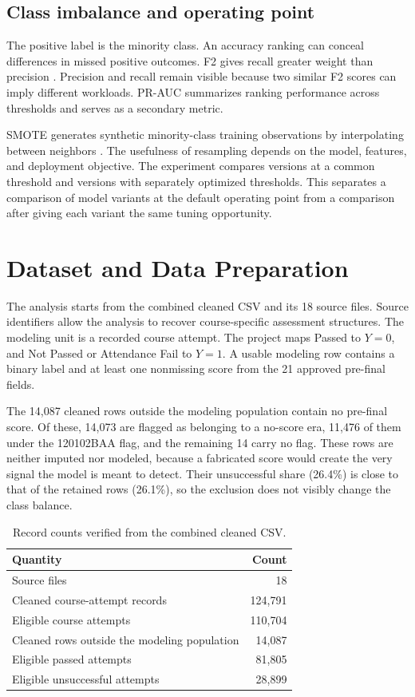 \documentclass[runningheads]{llncs}
\begin{document}
\subsection{Class imbalance and operating point}
The positive label is the minority class. An accuracy ranking can conceal differences in missed positive outcomes. F2 gives recall greater weight than precision \cite{fbeta}. Precision and recall remain visible because two similar F2 scores can imply different workloads. PR-AUC summarizes ranking performance across thresholds and serves as a secondary metric.

SMOTE generates synthetic minority-class training observations by interpolating between neighbors \cite{smote}. The usefulness of resampling depends on the model, features, and deployment objective. The experiment compares versions at a common threshold and versions with separately optimized thresholds. This separates a comparison of model variants at the default operating point from a comparison after giving each variant the same tuning opportunity.

\section{Dataset and Data Preparation}
The analysis starts from the combined cleaned CSV and its 18 source files. Source identifiers allow the analysis to recover course-specific assessment structures. The modeling unit is a recorded course attempt. The project maps Passed to \(Y=0\), and Not Passed or Attendance Fail to \(Y=1\). A usable modeling row contains a binary label and at least one nonmissing score from the 21 approved pre-final fields.

The 14,087 cleaned rows outside the modeling population contain no pre-final score. Of these, 14,073 are flagged as belonging to a no-score era, 11,476 of them under the 120102BAA flag, and the remaining 14 carry no flag. These rows are neither imputed nor modeled, because a fabricated score would create the very signal the model is meant to detect. Their unsuccessful share (26.4\%) is close to that of the retained rows (26.1\%), so the exclusion does not visibly change the class balance.

\begin{table}[h]
\caption{Record counts verified from the combined cleaned CSV.}
\label{tab:data}
\centering
\begin{tabular}{lr}
\toprule
Quantity & Count \\
\midrule
Source files & 18 \\
Cleaned course-attempt records & 124,791 \\
Eligible course attempts & 110,704 \\
Cleaned rows outside the modeling population & 14,087 \\
Eligible passed attempts & 81,805 \\
Eligible unsuccessful attempts & 28,899 \\
\bottomrule
\end{tabular}
\end{table}
\end{document}
